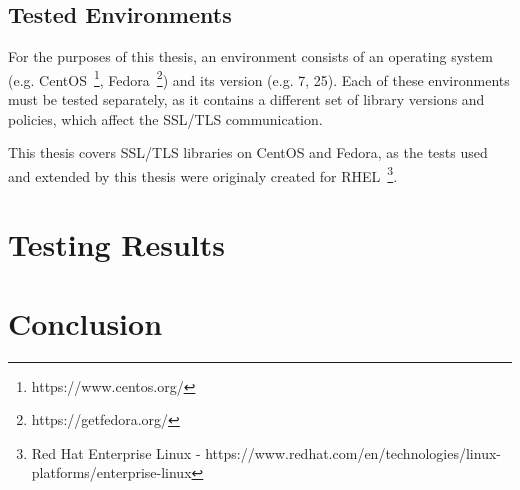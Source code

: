 \section{Tested Environments}
    For the purposes of this thesis, an environment consists of an operating
    system (e.g.
    CentOS~\footnote{https://www.centos.org/},
    Fedora~\footnote{https://getfedora.org/}) and its version
    (e.g. 7, 25). Each of these environments must be tested separately, as
    it contains a different set of library versions and policies, which
    affect the SSL/TLS communication.

    This thesis covers SSL/TLS libraries on CentOS and Fedora, as the tests used
    and extended by this thesis were originaly created for
    RHEL~\footnote{Red Hat Enterprise Linux -
    https://www.redhat.com/en/technologies/linux-platforms/enterprise-linux}.



\chapter {Testing Results}

\chapter {Conclusion}
